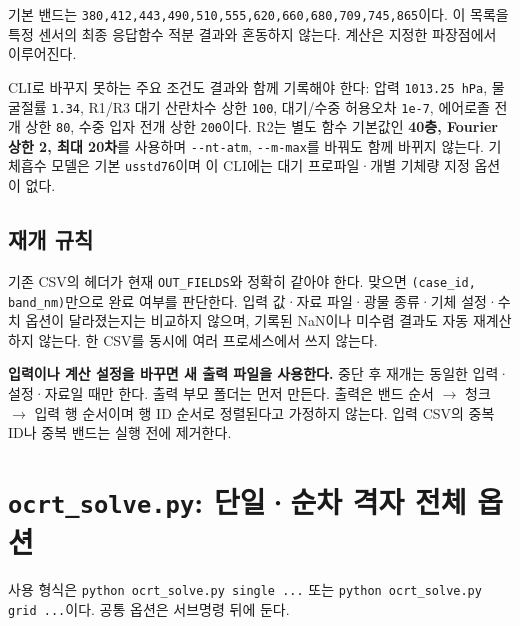 기본 밴드는 \texttt{380,\allowbreak{}412,\allowbreak{}443,\allowbreak{}490,\allowbreak{}510,\allowbreak{}555,\allowbreak{}620,\allowbreak{}660,\allowbreak{}680,\allowbreak{}709,\allowbreak{}745,\allowbreak{}865}이다. 이 목록을 특정 센서의 최종 응답함수 적분 결과와 혼동하지 않는다. 계산은 지정한 파장점에서 이루어진다.

CLI로 바꾸지 못하는 주요 조건도 결과와 함께 기록해야 한다: 압력 \texttt{1013.\allowbreak{}25 hPa}, 물 굴절률 \texttt{1.\allowbreak{}34}, R1/R3 대기 산란차수 상한 \texttt{100}, 대기/수중 허용오차 \texttt{1e-\allowbreak{}7}, 에어로졸 전개 상한 \texttt{80}, 수중 입자 전개 상한 \texttt{200}이다. R2는 별도 함수 기본값인 \textbf{40층, Fourier 상한 2, 최대 20차}를 사용하며 \texttt{-\allowbreak{}-\allowbreak{}nt-\allowbreak{}atm}, \texttt{-\allowbreak{}-\allowbreak{}m-\allowbreak{}max}를 바꿔도 함께 바뀌지 않는다. 기체흡수 모델은 기본 \texttt{usstd76}이며 이 CLI에는 대기 프로파일·개별 기체량 지정 옵션이 없다.

\subsection{재개 규칙}
\label{sec:auto:06_python_batch:4.1}
기존 CSV의 헤더가 현재 \texttt{OUT\_\allowbreak{}FIELDS}와 정확히 같아야 한다. 맞으면 \texttt{(case\_\allowbreak{}id,\allowbreak{} band\_\allowbreak{}nm)}만으로 완료 여부를 판단한다. 입력 값·자료 파일·광물 종류·기체 설정·수치 옵션이 달라졌는지는 비교하지 않으며, 기록된 NaN이나 미수렴 결과도 자동 재계산하지 않는다. 한 CSV를 동시에 여러 프로세스에서 쓰지 않는다.

\textbf{입력이나 계산 설정을 바꾸면 새 출력 파일을 사용한다.} 중단 후 재개는 동일한 입력·설정·자료일 때만 한다. 출력 부모 폴더는 먼저 만든다. 출력은 밴드 순서 \ensuremath{\rightarrow} 청크 \ensuremath{\rightarrow} 입력 행 순서이며 행 ID 순서로 정렬된다고 가정하지 않는다. 입력 CSV의 중복 ID나 중복 밴드는 실행 전에 제거한다.

\section{\texttt{ocrt\_\allowbreak{}solve.\allowbreak{}py}: 단일·순차 격자 전체 옵션}
\label{sec:auto:06_python_batch:5}
사용 형식은 \texttt{python ocrt\_\allowbreak{}solve.\allowbreak{}py single .\allowbreak{}.\allowbreak{}.\allowbreak{}} 또는 \texttt{python ocrt\_\allowbreak{}solve.\allowbreak{}py grid .\allowbreak{}.\allowbreak{}.\allowbreak{}}이다. 공통 옵션은 서브명령 뒤에 둔다.



